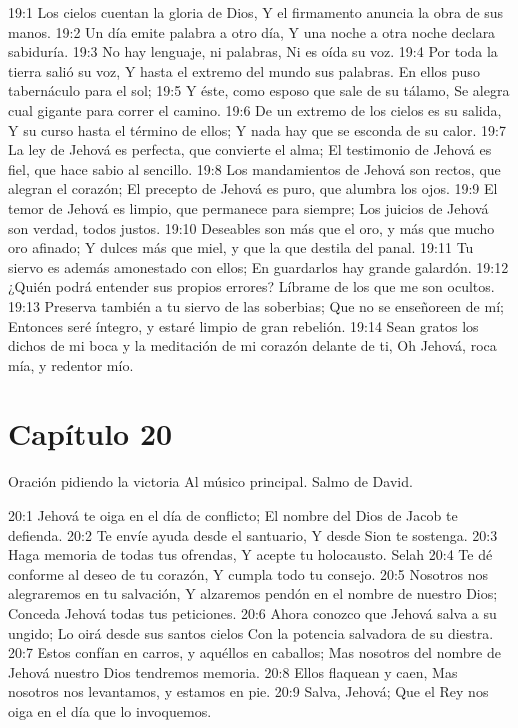 19:1 Los cielos cuentan la gloria de Dios, 
Y el firmamento anuncia la obra de sus manos. 
19:2 Un día emite palabra a otro día, 
Y una noche a otra noche declara sabiduría. 
19:3 No hay lenguaje, ni palabras, 
Ni es oída su voz. 
19:4 Por toda la tierra salió su voz, 
Y hasta el extremo del mundo sus palabras. 
En ellos puso tabernáculo para el sol; 
19:5 Y éste, como esposo que sale de su tálamo, 
Se alegra cual gigante para correr el camino. 
19:6 De un extremo de los cielos es su salida, 
Y su curso hasta el término de ellos; 
Y nada hay que se esconda de su calor. 
19:7 La ley de Jehová es perfecta, que convierte el alma; 
El testimonio de Jehová es fiel, que hace sabio al sencillo. 
19:8 Los mandamientos de Jehová son rectos, que alegran el corazón; 
El precepto de Jehová es puro, que alumbra los ojos. 
19:9 El temor de Jehová es limpio, que permanece para siempre; 
Los juicios de Jehová son verdad, todos justos. 
19:10 Deseables son más que el oro, y más que mucho oro afinado; 
Y dulces más que miel, y que la que destila del panal. 
19:11 Tu siervo es además amonestado con ellos; 
En guardarlos hay grande galardón. 
19:12 ¿Quién podrá entender sus propios errores? 
Líbrame de los que me son ocultos. 
19:13 Preserva también a tu siervo de las soberbias; 
Que no se enseñoreen de mí; 
Entonces seré íntegro, y estaré limpio de gran rebelión. 
19:14 Sean gratos los dichos de mi boca y la meditación de mi corazón delante de ti, 
Oh Jehová, roca mía, y redentor mío. 
\section*{Capítulo 20}
Oración pidiendo la victoria 
Al músico principal. Salmo de David. 

20:1 Jehová te oiga en el día de conflicto; 
El nombre del Dios de Jacob te defienda. 
20:2 Te envíe ayuda desde el santuario, 
Y desde Sion te sostenga. 
20:3 Haga memoria de todas tus ofrendas, 
Y acepte tu holocausto. Selah 
20:4 Te dé conforme al deseo de tu corazón, 
Y cumpla todo tu consejo. 
20:5 Nosotros nos alegraremos en tu salvación, 
Y alzaremos pendón en el nombre de nuestro Dios; 
Conceda Jehová todas tus peticiones. 
20:6 Ahora conozco que Jehová salva a su ungido; 
Lo oirá desde sus santos cielos 
Con la potencia salvadora de su diestra. 
20:7 Estos confían en carros, y aquéllos en caballos; 
Mas nosotros del nombre de Jehová nuestro Dios tendremos memoria. 
20:8 Ellos flaquean y caen, 
Mas nosotros nos levantamos, y estamos en pie. 
20:9 Salva, Jehová; 
Que el Rey nos oiga en el día que lo invoquemos. 

